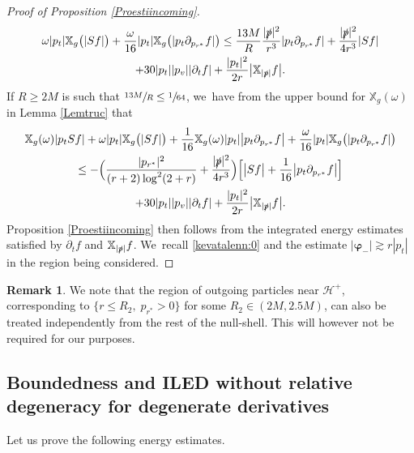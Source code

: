 \documentclass[JEP,XML,SOM,Unicode,published]{cedram}
\theoremstyle{plain}
\theoremstyle{definition}
\newtheorem{remark}[proposition]{Remark}
\newcommand\T{{\mathbb{X}}}
\begin{document}
\begin{proof}[Proof of Proposition \ref{Proestiincoming}]
\begin{multline*}
\omega|p_t| \T_g\bigl(|Sf| \bigr)+\frac{\omega}{16} |p_t| \T_g\bigl(|p_t \partial_{p_{r^*}}f| \bigr) \leq \frac{13M}{R} \frac{ |\slashed{p}|^2}{r^3} |p_t \partial_{p_{r^*}} f |+\frac{|\slashed{p}|^2}{4r^3 } |Sf| \\
+30 |p_t||p_v||\partial_t f| +\frac{|p_{t}|^2}{2r } \big|\T_{|\slashed{p}|} f \big|.
\end{multline*}
If $R\geq 2M$ is such that $\sfrac{13M}{R} \leq \sfrac{1}{64}$, we~have from the upper bound for $\T_g(\omega)$ in Lemma \ref{Lemtruc} that
\begin{multline} \label{eq:forRk641}
\T_g(\omega) |p_t Sf| +\omega|p_t| \T_g\bigl(|Sf| \bigr)+ \frac{1}{16}\T_g(\omega) |p_t| \big|p_t \partial_{p_{r^*}}f \big| +\frac{\omega}{16}|p_t| \T_g\bigl(|p_t \partial_{p_{r^*}}f| \bigr) \\
\leq -\Bigl(\frac{|p_{r^*}|^2}{(r+2)\log^2(2+r)}+\frac{|\slashed{p}|^2}{4r^3} \Bigr)  \Bigl[\big|S f \big| + \frac{1}{16}\big|p_t \partial_{p_{r^*}} f \big| \Bigr]\\
+30 |p_t||p_v||\partial_t f| +\frac{|p_{t}|^2}{2r } \big|\T_{|\slashed{p}|} f \big|.
\end{multline}
Proposition \ref{Proestiincoming} then follows from the integrated energy estimates satisfied by $\partial_t f$ and $\T_{|\slashed{p}|} f$. We~recall \eqref{kevatalenn:0} and the estimate $|\pmb{\varphi}_-| \gtrsim r |p_t|$ in the region being considered.
\end{proof}

\begin{remark}
We note that the region of outgoing particles near $\mathcal{H}^+$, corresponding to $\{ r \leq R_2, \; p_{r^*} >0 \}$ for some $R_2 \in (2M,2.5M)$, can also be treated independently from the rest of the null-shell. This will however not be required for our purposes.
\end{remark}

\subsection{Boundedness and ILED without relative degeneracy for degenerate derivatives}\label{Subsec73}

Let us prove the following energy estimates.
\end{document}
